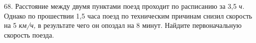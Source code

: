 68. Расстояние между двумя пунктами поезд проходит по расписанию за 3,5 {\it ч.} Однако по прошествии 1,5 часа поезд по техническим причинам снизил скорость на 5 {\it км/ч,} в результате чего он опоздал на 8 минут. Найдите первоначальную скорость поезда.\\
